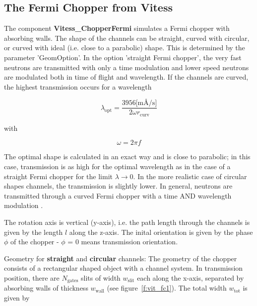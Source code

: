 
\subsection*{The Fermi Chopper from Vitess}
\label{s:vit_fc}



The component \textbf{Vitess\_ChopperFermi} simulates a Fermi chopper with absorbing walls.
The shape of the channels can be straight, curved with circular, or curved with ideal
(i.e. close to a parabolic) shape.
This is determined by the parameter 'GeomOption'. In the option 'straight Fermi
chopper', the very fast neutrons are transmitted with only a time modulation and lower
speed neutrons are modulated both in time of flight and wavelength.
If the channels are curved, the highest transmission occurs for a wavelength

\begin{equation}
\lambda_\textrm{opt} = \frac{3956 \textrm{[m\AA/s]}}{2 \omega r_\textrm{curv}}
\end{equation}

with

\begin{equation}
\omega = 2 \pi f
\end{equation}

The optimal shape is calculated in an exact way and is close to parabolic; in this
case, transmission is as high for the optimal wavelength as in the case of a straight
Fermi chopper for the limit $\lambda \rightarrow 0$.
In the more realistic case of circular shapes channels, the transmission is slightly
lower. In general, neutrons are transmitted through a curved Fermi chopper with a time
AND wavelength modulation .

The rotation axis is vertical (y-axis), i.e. the path length through the channels is
given by the length $l$ along the z-axis. The inital orientation is given by the phase
$\phi$ of the chopper - $\phi$ = 0 means transmission orientation.

Geometry for \textbf{straight} and \textbf{circular} channels:
The geometry of the chopper consists of a rectangular shaped object with a channel
system. In transmission position, there are $N_\textrm{gates}$ slits of width $w_\textrm{slit}$
each along the x-axis, separated by absorbing walls of thickness $w_\textrm{wall}$
(see figure~\ref{f:vit_fc1}). The total width $w_\textrm{tot}$ is given by

